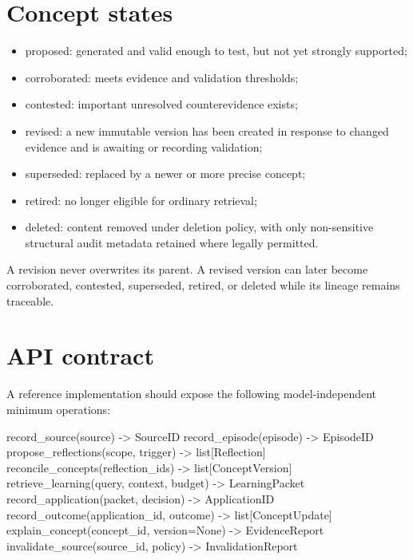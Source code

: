 \documentclass[
  english,
  a4paper,
  DIV=11,
  numbers=noendperiod]{scrreprt}
\newenvironment{Shaded}{\begin{snugshade}}{\end{snugshade}}
\newcommand{\NormalTok}[1]{\textcolor[rgb]{0.00,0.23,0.31}{#1}}
\providecommand{\tightlist}{%
  \setlength{\itemsep}{0pt}\setlength{\parskip}{0pt}}
\begin{document}
\section{Concept states}\label{concept-states}

\begin{itemize}
\tightlist
\item
  proposed: generated and valid enough to test, but not yet strongly
  supported;
\item
  corroborated: meets evidence and validation thresholds;
\item
  contested: important unresolved counterevidence exists;
\item
  revised: a new immutable version has been created in response to
  changed evidence and is awaiting or recording validation;
\item
  superseded: replaced by a newer or more precise concept;
\item
  retired: no longer eligible for ordinary retrieval;
\item
  deleted: content removed under deletion policy, with only
  non-sensitive structural audit metadata retained where legally
  permitted.
\end{itemize}

A revision never overwrites its parent. A revised version can later
become corroborated, contested, superseded, retired, or deleted while
its lineage remains traceable.

\section{API contract}\label{api-contract}

A reference implementation should expose the following model-independent
minimum operations:

\begin{Shaded}
\begin{Highlighting}[]
\NormalTok{record\_source(source) {-}\textgreater{} SourceID}
\NormalTok{record\_episode(episode) {-}\textgreater{} EpisodeID}
\NormalTok{propose\_reflections(scope, trigger) {-}\textgreater{} list[Reflection]}
\NormalTok{reconcile\_concepts(reflection\_ids) {-}\textgreater{} list[ConceptVersion]}
\NormalTok{retrieve\_learning(query, context, budget) {-}\textgreater{} LearningPacket}
\NormalTok{record\_application(packet, decision) {-}\textgreater{} ApplicationID}
\NormalTok{record\_outcome(application\_id, outcome) {-}\textgreater{} list[ConceptUpdate]}
\NormalTok{explain\_concept(concept\_id, version=None) {-}\textgreater{} EvidenceReport}
\NormalTok{invalidate\_source(source\_id, policy) {-}\textgreater{} InvalidationReport}
\end{Highlighting}
\end{Shaded}
\end{document}
